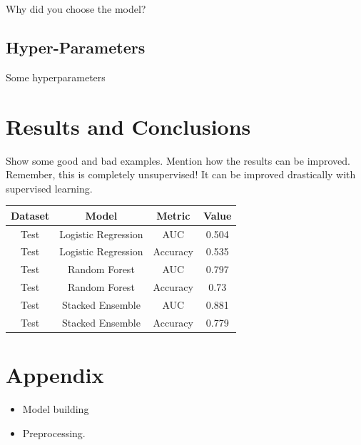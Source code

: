\documentclass[%
aip,
amsmath,amssymb,
reprint,%
]{revtex4-1}
\begin{document}
Why did you choose the model?

\subsection{Hyper-Parameters}

Some hyperparameters

\section{Results and Conclusions}

Show some good and bad examples. Mention how the results can be improved. Remember, this is completely unsupervised! It can be improved drastically with supervised learning.

\begin{center}
 \begin{tabular}{|c | c | c | c |} 
 \hline
 \textbf{Dataset} & \textbf{Model}& \textbf{Metric} & \textbf{Value} \\ [0.5 ex]
 \hline
 Test & Logistic Regression & AUC & 0.504 \\ 
 \hline
 Test & Logistic Regression & Accuracy & 0.535 \\
 \hline
 Test & Random Forest & AUC & 0.797 \\
 \hline
 Test & Random Forest & Accuracy & 0.73 \\
 \hline
 Test & Stacked Ensemble & AUC & 0.881 \\
 \hline
 Test & Stacked Ensemble & Accuracy & 0.779 \\ [1ex] 
 \hline
\end{tabular}
\end{center}

\vspace{60 mm}
\section*{Appendix}

\begin{itemize}
\item Model building
\end{itemize}



\begin{itemize}
\item Preprocessing. 
\end{itemize}
\end{document}
